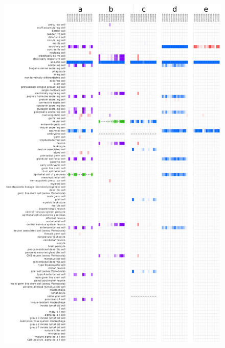 \clearpage
 \begin{figure}
    \thispagestyle{empty}
    \centerline{\includegraphics[scale=0.20, angle=-90]
    {figures/all_prediction_matrices_subsamples.pdf}}

\end{figure}
